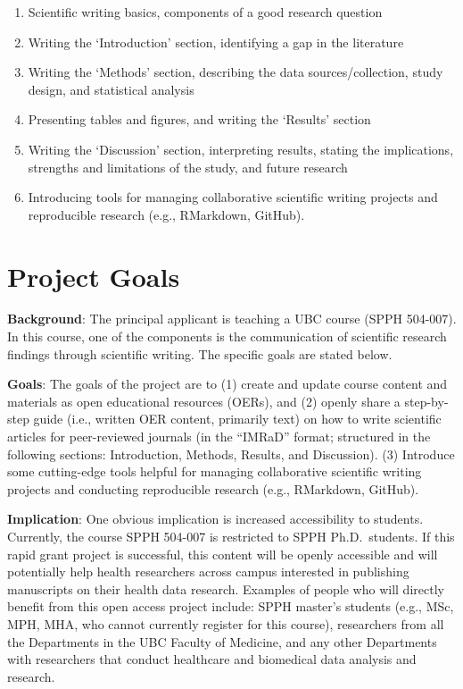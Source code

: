 \documentclass[
]{book}
\providecommand{\tightlist}{%
  \setlength{\itemsep}{0pt}\setlength{\parskip}{0pt}}
\begin{document}
\begin{enumerate}
\def\labelenumi{\arabic{enumi}.}
\tightlist
\item
  Scientific writing basics, components of a good research question
\item
  Writing the `Introduction' section, identifying a gap in the literature
\item
  Writing the `Methods' section, describing the data sources/collection, study design, and statistical analysis
\item
  Presenting tables and figures, and writing the `Results' section
\item
  Writing the `Discussion' section, interpreting results, stating the implications, strengths and limitations of the study, and future research
\item
  Introducing tools for managing collaborative scientific writing projects and reproducible research (e.g., RMarkdown, GitHub).
\end{enumerate}

\hypertarget{project-goals}{%
\section*{Project Goals}\label{project-goals}}

\textbf{Background}: The principal applicant is teaching a UBC course (SPPH 504-007). In this course, one of the components is the communication of scientific research findings through scientific writing. The specific goals are stated below.

\textbf{Goals}: The goals of the project are to (1) create and update course content and materials as open educational resources (OERs), and (2) openly share a step-by-step guide (i.e., written OER content, primarily text) on how to write scientific articles for peer-reviewed journals (in the ``IMRaD'' format; structured in the following sections: Introduction, Methods, Results, and Discussion). (3) Introduce some cutting-edge tools helpful for managing collaborative scientific writing projects and conducting reproducible research (e.g., RMarkdown, GitHub).

\textbf{Implication}: One obvious implication is increased accessibility to students. Currently, the course SPPH 504-007 is restricted to SPPH Ph.D.~students. If this rapid grant project is successful, this content will be openly accessible and will potentially help health researchers across campus interested in publishing manuscripts on their health data research. Examples of people who will directly benefit from this open access project include: SPPH master's students (e.g., MSc, MPH, MHA, who cannot currently register for this course), researchers from all the Departments in the UBC Faculty of Medicine, and any other Departments with researchers that conduct healthcare and biomedical data analysis and research.
\end{document}
